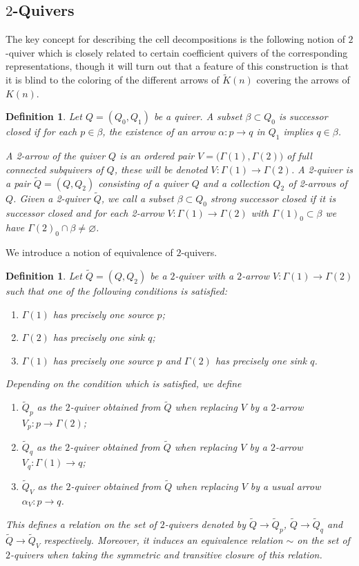 \documentclass{amsart}
\newtheorem{definition}[theorem]{Definition}
\numberwithin{equation}{section}
\begin{document}
\subsection{$2$-Quivers}

The key concept for describing the cell decompositions is the following notion of $2$-quiver which is closely related to certain coefficient quivers of the corresponding representations, though it will turn out that a feature of this construction is that it is blind to the coloring of the different arrows of $\widetilde K(n)$ covering the arrows of $K(n)$.
\begin{definition}
  Let $Q=(Q_0,Q_1)$ be a quiver.
  A subset $\beta\subset Q_0$ is \emph{successor closed} if for each $p\in\beta$, the existence of an arrow $\alpha:p\to q$ in $Q_1$ implies $q\in\beta$.

  A \emph{2-arrow} of the quiver $Q$ is an ordered pair $V=\big(\Gamma(1),\Gamma(2)\big)$ of full connected subquivers of $Q$, these will be denoted $V:\Gamma(1)\to\Gamma(2)$.
  A \emph{2-quiver} is a pair $\tilde Q=(Q,Q_2)$ consisting of a quiver $Q$ and a collection $Q_2$ of 2-arrows of $Q$.
  Given a 2-quiver $\tilde Q$, we call a subset $\beta\subset Q_0$ \emph{strong successor closed} if it is successor closed and for each 2-arrow $V:\Gamma(1)\to\Gamma(2)$ with $\Gamma(1)_0\subset\beta$ we have $\Gamma(2)_0\cap\beta\ne\varnothing$.  

\end{definition}
We introduce a notion of equivalence of $2$-quivers.
\begin{definition}\label{def:2equivalence}
Let $\tilde Q=(Q,Q_2)$ be a $2$-quiver with a $2$-arrow $V:\Gamma(1)\to\Gamma(2)$ such that one of the following conditions is satisfied:
\begin{enumerate}
\item $\Gamma(1)$ has precisely one source $p$; 
\item $\Gamma(2)$ has precisely one sink $q$;
\item $\Gamma(1)$ has precisely one source $p$ and $\Gamma(2)$ has precisely one sink $q$.
\end{enumerate}
Depending on the condition which is satisfied, we define
\begin{enumerate}
\item $\tilde Q_p$ as the $2$-quiver obtained from $\tilde Q$ when replacing $V$ by a $2$-arrow $V_p:p\to\Gamma(2)$;
\item $\tilde Q_q$ as the $2$-quiver obtained from $\tilde Q$ when replacing $V$ by a $2$-arrow $V_q:\Gamma(1)\to q$;
\item $\tilde Q_V$ as the $2$-quiver obtained from $\tilde Q$ when replacing $V$ by a usual arrow $\alpha_V:p\to q$. 
\end{enumerate}

This defines a relation on the set of $2$-quivers denoted by $\tilde Q\to \tilde Q_p$, $\tilde Q\to \tilde Q_q$ and $\tilde Q\to \tilde Q_V$ respectively. Moreover, it induces an equivalence relation $\sim$ on the set of $2$-quivers when taking the symmetric and transitive closure of this relation. 
\end{definition}
\end{document}
